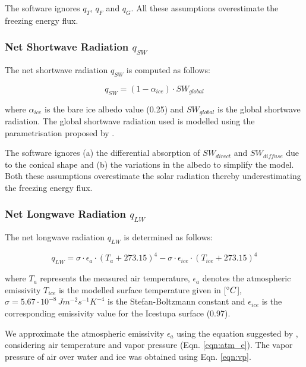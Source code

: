 \documentclass[utf8]{frontiersSCNS}
\begin{document}
The software ignores $q_{T}$, $q_{F}$ and $q_{G}$. All these assumptions overestimate the freezing energy flux.

\subsubsection{Net Shortwave Radiation \texorpdfstring{$q_{SW}$}{Lg}} \label{sec:SW}

The net shortwave radiation $q_{SW}$ is computed as follows:

\begin{equation} q_{SW} = (1- \alpha_{ice})\cdot SW_{global} \label{eqn:SW} \end{equation}

where $\alpha_{ice}$ is the bare ice albedo value (0.25) and $SW_{global}$ is the global shortwave radiation.
The global shortwave radiation used is modelled using the parametrisation proposed by \cite{Woolf_1968}.

The software ignores (a) the differential absorption of $SW_{direct}$ and $SW_{diffuse}$ due to the conical
shape and (b) the variations in the albedo to simplify the model. Both these assumptions overestimate the solar
radiation thereby underestimating the freezing energy flux.

\subsubsection{Net Longwave Radiation \texorpdfstring{$q_{LW}$}{Lg}} \label{sec:LW}

The net longwave radiation $q_{LW}$ is determined as follows:

\begin{equation}
	q_{LW}= \sigma \cdot \epsilon_a \cdot {(T_a+ 273.15)}^4 -\sigma \cdot \epsilon_{ice} \cdot {(T_{ice}+ 273.15)}^4
	\label{eqn:LW}
\end{equation}

where $T_a$ represents the measured air temperature, $\epsilon_a$ denotes the atmospheric emissivity $T_{ice}$
is the modelled surface temperature given in [$\degree C$], $\sigma=5.67\cdot10^{-8}\,Jm^{-2}s^{-1}K^{-4}$ is
the Stefan-Boltzmann constant and $\epsilon_{ice}$ is the corresponding emissivity value for the Icestupa
surface (0.97).

 We approximate the atmospheric emissivity $\epsilon_a$ using the
equation suggested by \cite{Brutsaert_1975}, considering air temperature and vapor pressure (Eqn.
\ref{eqn:atm_e}). The vapor pressure of air over water and ice was obtained using Eqn. \ref{eqn:vp}.  
\end{document}
